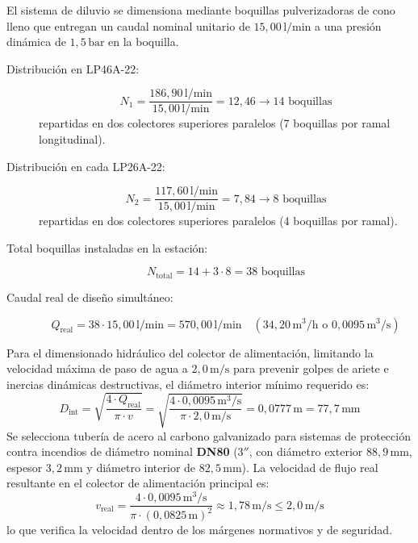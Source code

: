 \documentclass[12pt]{article}
\begin{document}
        El sistema de diluvio se dimensiona mediante boquillas pulverizadoras de cono lleno que entregan un caudal nominal unitario de $15,00\,\text{l}/\text{min}$ a una presión dinámica de $1,5\,\text{bar}$ en la boquilla.
        \begin{description}
            \item[Distribución en LP46A-22:]
            \begin{equation}
                N_1 = \frac{186,90\,\text{l}/\text{min}}{15,00\,\text{l}/\text{min}} = 12,46 \rightarrow 14\text{ boquillas}
            \end{equation}
            repartidas en dos colectores superiores paralelos (7 boquillas por ramal longitudinal).
            \item[Distribución en cada LP26A-22:]
            \begin{equation}
                N_2 = \frac{117,60\,\text{l}/\text{min}}{15,00\,\text{l}/\text{min}} = 7,84 \rightarrow 8\text{ boquillas}
            \end{equation}
            repartidas en dos colectores superiores paralelos (4 boquillas por ramal).
            \item[Total boquillas instaladas en la estación:] 
            \begin{equation}
                N_{\text{total}} = 14 + 3 \cdot 8 = 38\text{ boquillas}
            \end{equation}

            \item[Caudal real de diseño simultáneo:]
            \begin{equation}
                Q_{\text{real}} = 38 \cdot 15,00\,\text{l}/\text{min} = 570,00\,\text{l}/\text{min} \quad (34,20\,\text{m}^3/\text{h} \text{ o } 0,0095\,\text{m}^3/\text{s})
            \end{equation}
        \end{description}

        Para el dimensionado hidráulico del colector de alimentación, limitando la velocidad máxima de paso de agua a $2,0\,\text{m}/\text{s}$ para prevenir golpes de ariete e inercias dinámicas destructivas, el diámetro interior mínimo requerido es:
        \begin{equation}
            D_{\text{int}} = \sqrt{\frac{4 \cdot Q_{\text{real}}}{\pi \cdot v}} = \sqrt{\frac{4 \cdot 0,0095\,\text{m}^3/\text{s}}{\pi \cdot 2,0\,\text{m}/\text{s}}} = 0,0777\,\text{m} = 77,7\,\text{mm}
        \end{equation}
        Se selecciona tubería de acero al carbono galvanizado para sistemas de protección contra incendios de diámetro nominal \textbf{DN80} ($3''$, con diámetro exterior $88,9\,\text{mm}$, espesor $3,2\,\text{mm}$ y diámetro interior de $82,5\,\text{mm}$).
        La velocidad de flujo real resultante en el colector de alimentación principal es:
        \begin{equation}
            v_{\text{real}} = \frac{4 \cdot 0,0095\,\text{m}^3/\text{s}}{\pi \cdot (0,0825\,\text{m})^2} \approx 1,78\,\text{m}/\text{s} \le 2,0\,\text{m}/\text{s}
        \end{equation}
        lo que verifica la velocidad dentro de los márgenes normativos y de seguridad.
\end{document}

